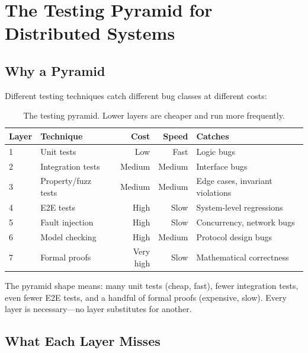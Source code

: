 \section{The Testing Pyramid for Distributed Systems}


\subsection{Why a Pyramid}

Different testing techniques catch different bug classes at different costs:

\begin{table}[H]
\centering
\small
\begin{tabular}{@{}llrrl@{}}
\toprule
\textbf{Layer} & \textbf{Technique} & \textbf{Cost} & \textbf{Speed} & \textbf{Catches} \\
\midrule
1 & Unit tests & Low & Fast & Logic bugs \\
2 & Integration tests & Medium & Medium & Interface bugs \\
3 & Property/fuzz tests & Medium & Medium & Edge cases, invariant violations \\
4 & E2E tests & High & Slow & System-level regressions \\
5 & Fault injection & High & Slow & Concurrency, network bugs \\
6 & Model checking & High & Medium & Protocol design bugs \\
7 & Formal proofs & Very high & Slow & Mathematical correctness \\
\bottomrule
\end{tabular}
\caption{The testing pyramid. Lower layers are cheaper and run more frequently.}
\end{table}

The pyramid shape means: many unit tests (cheap, fast), fewer integration tests, even
fewer E2E tests, and a handful of formal proofs (expensive, slow). Every layer is
necessary---no layer substitutes for another.

\subsection{What Each Layer Misses}

